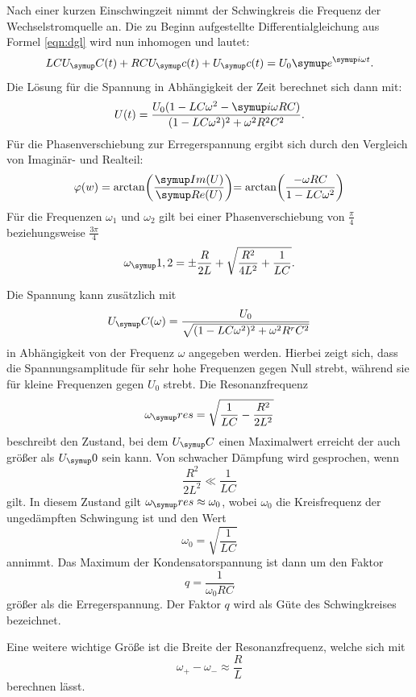 Nach einer kurzen Einschwingzeit nimmt der Schwingkreis die Frequenz der
Wechselstromquelle an. Die zu Beginn aufgestellte Differentialgleichung aus
Formel \eqref{eqn:dgl} wird nun inhomogen und lautet:
\begin{equation}
  LCU_\su{C}(t) + RCU_\su{c}(t) + U_\su{c}(t) =U_0\su{e}^{\su{i}\omega t}.
  \label{eqn:inh}
\end{equation}
Die Lösung für die Spannung in Abhängigkeit der Zeit berechnet sich dann mit:
\begin{equation}
  U(t)=\frac{U_0(1-LC\omega^2-\su{i}\omega RC)}{(1-LC\omega^2)^2+\omega^2 R^2 C^2}.
\end{equation}
Für die Phasenverschiebung zur Erregerspannung ergibt sich durch den Vergleich
von Imaginär- und Realteil: %
\begin{equation}
  \varphi(w)=\arctan\biggr(\frac{\su{Im}(U)}{\su{Re}(U)}\biggl)
  =\arctan\biggr(\frac{-\omega RC}{1-LC\omega^2}\biggl)
\end{equation}
Für die Frequenzen $\omega_1$ und $\omega_2$ gilt bei einer Phasenverschiebung
von $\frac{\pi}{4}$ beziehungsweise $\frac{3\pi}{4}$
\begin{equation}
  \omega_\su{1,2}=\pm\frac{R}{2L}+\sqrt{\frac{R^2}{4L^2}+\frac{1}{LC}}.
\end{equation}

Die Spannung kann zusätzlich mit
\begin{equation}
  U_\su{C}(\omega)=\frac{U_0}{\sqrt{(1-LC\omega^2)^2+\omega^2R^rC^2}}
\end{equation}
in Abhängigkeit von der Frequenz $\omega$ angegeben werden.
Hierbei zeigt sich, dass die Spannungsamplitude für sehr hohe Frequenzen gegen
Null strebt, während sie für kleine Frequenzen gegen $U_0$ strebt.
Die Resonanzfrequenz
\begin{equation}
  \omega_\su{res}=\sqrt{\frac{1}{LC}-\frac{R^2}{2L^2}}
\end{equation}
beschreibt den Zustand, bei dem $U_\su{C}$ einen Maximalwert erreicht der auch
größer als $U_\su{0}$ sein kann.
Von schwacher Dämpfung wird gesprochen, wenn
\begin{equation}
  \frac{R^2}{2L^2} \ll \frac{1}{LC}
\end{equation}
gilt. In diesem Zustand gilt $\omega_\su{res}\approx\omega_0$, wobei $\omega_0$
die Kreisfrequenz der ungedämpften Schwingung ist und den Wert
\begin{equation}
  \omega_0 =\sqrt{\frac{1}{LC}}
\end{equation}
annimmt. Das Maximum der Kondensatorspannung ist dann um den Faktor
\begin{equation}
  q=\frac{1}{\omega_0RC}
  \label{eqn:guete}
\end{equation}
größer als die Erregerspannung. Der Faktor $q$ wird als Güte des Schwingkreises
bezeichnet.

Eine weitere wichtige Größe ist die Breite der Resonanzfrequenz, welche sich mit
\begin{equation}
  \omega_+ - \omega_- \approx \frac{R}{L}
  \label{eqn:breite}
\end{equation}
berechnen lässt.
